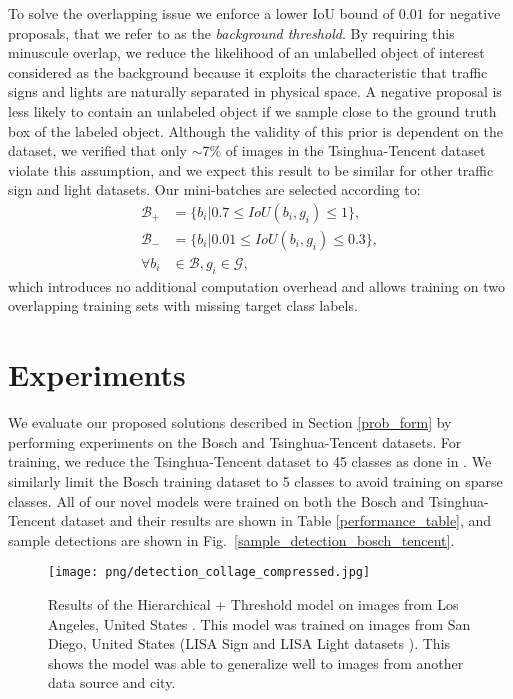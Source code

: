 \documentclass[10pt, conference, compsocconf]{IEEEtran}
\newcommand{\fig}[1]{Fig.~\ref{#1}}
\begin{document}
To solve the overlapping issue we enforce a lower IoU bound of $0.01$ for negative proposals, that we refer to as the \textit{background threshold}. By requiring this minuscule overlap, we reduce the likelihood of an unlabelled object of interest considered as the background because it exploits the characteristic that traffic signs and lights are naturally separated in physical space. A negative proposal is less likely to contain an unlabeled object if we sample close to the ground truth box of the labeled object. Although the validity of this prior is dependent on the dataset, we verified that only $\sim$7\% of images in the Tsinghua-Tencent dataset violate this assumption, and we expect this result to be similar for other traffic sign and light datasets. Our mini-batches are selected according to:
\begin{equation}
\begin{aligned}
\mathcal{B}_{+} &= \{b_i| 0.7 \leq IoU(b_i,g_i) \leq 1\}, \\
\mathcal{B}_{-} &= \{b_i| 0.01 \leq IoU(b_i,g_i) \leq 0.3 \}, \\
\forall b_i& \in \mathcal{B}, g_i \in \mathcal{G},
\end{aligned}
\end{equation}
which introduces no additional computation overhead and allows training on two overlapping training sets with missing target class labels.

\section{Experiments} \label{experiments}

We evaluate our proposed solutions described in Section \ref{prob_form} by performing experiments on the Bosch and Tsinghua-Tencent datasets. For training, we reduce the Tsinghua-Tencent dataset to 45 classes as done in \cite{tencent,perceptual_gan, meng}. We similarly limit the Bosch training dataset to 5 classes to avoid training on sparse classes. All of our novel models were trained on both the Bosch and Tsinghua-Tencent dataset and their results are shown in Table \ref{performance_table}, and sample detections are shown in \fig{sample_detection_bosch_tencent}.

\begin{figure*}[t]
    \begin{center}
    \texttt{[image: png/detection\_collage\_compressed.jpg]}
    \end{center}
    \caption{Results of the Hierarchical + Threshold model on images from Los Angeles, United States \cite{la_video}. This model was trained on images from San Diego, United States (LISA Sign \cite{lisa_signs} and LISA Light datasets \cite{lisa1,lisa2}). This shows the model was able to generalize well to images from another data source and city.}
    \label{sample_detection_la}
\end{figure*}
\end{document}
